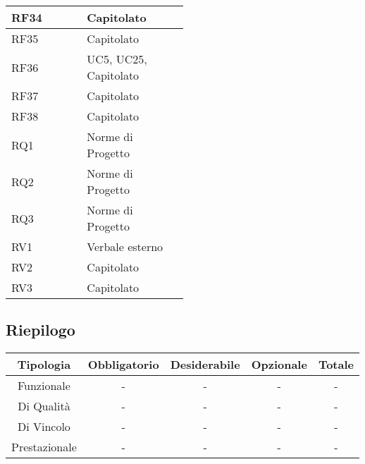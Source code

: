 \begin{center}
\begin{tabular}{ |p{0.25\linewidth}|p{0.25\linewidth}| }
		\hline
		RF34 & Capitolato \\
		\hline
		RF35 & Capitolato \\
		\hline
		RF36 & UC5, UC25, Capitolato \\
		\hline
		RF37 & Capitolato \\
		\hline
		RF38 & Capitolato \\
		\hline
		RQ1 & Norme di Progetto \\
		\hline
		RQ2 & Norme di Progetto \\
		\hline
		RQ3 & Norme di Progetto \\
		\hline
		RV1 & Verbale esterno \\
		\hline
		RV2 & Capitolato \\
		\hline
		RV3 & Capitolato \\
		\hline
	\end{tabular}
\end{center}
\fi

\subsection{Riepilogo}
\begin{center}

	\begin{tabular}{ |c|c|c|c|c| } 
		\hline
		\textbf{Tipologia} & \textbf{Obbligatorio} & \textbf{Desiderabile} & \textbf{Opzionale} & \textbf{Totale}\\
		\hline
		Funzionale & - & - & - & - \\
		\hline
		Di Qualità & - & - & - & - \\
		\hline
		Di Vincolo & - & - & - & - \\
		\hline
		Prestazionale & - & - & - & - \\
		\hline
	\end{tabular}

\end{center}
